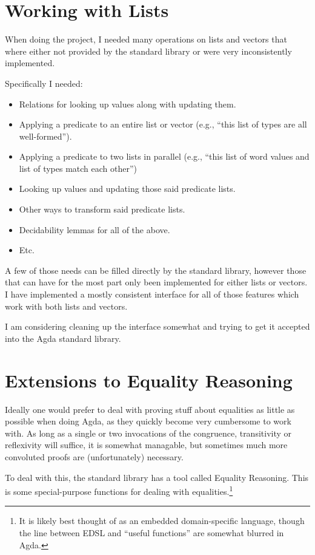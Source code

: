 \section{Working with Lists}
When doing the project, I needed many operations on lists and vectors that where
either not provided by the standard library or were very inconsistently
implemented.

Specifically I needed:

\begin{itemize}
\item Relations for looking up values along with updating them.
\item Applying a predicate to an entire list or vector (e.g., ``this list of types are all well-formed'').
\item Applying a predicate to two lists in parallel (e.g., ``this list of word values and list of types match each other'')
\item Looking up values and updating those said predicate lists.
\item Other ways to transform said predicate lists.
\item Decidability lemmas for all of the above.
\item Etc.
\end{itemize}

A few of those needs can be filled directly by the standard library, however
those that can have for the most part only been implemented for either lists or
vectors. I have implemented a mostly consistent interface for all of those
features which work with both lists and vectors.

I am considering cleaning up the interface somewhat and trying to get it
accepted into the Agda standard library.

\section{Extensions to Equality Reasoning}
Ideally one would prefer to deal with proving stuff about equalities as little
as possible when doing Agda, as they quickly become very cumbersome to work
with. As long as a single or two invocations of the congruence, transitivity or
reflexivity will suffice, it is somewhat managable, but sometimes much more
convoluted proofs are (unfortunately) necessary.

To deal with this, the standard library has a tool called Equality
Reasoning. This is some special-purpose functions for dealing with
equalities.\footnote{It is likely best thought of as an embedded domain-specific
  language, though the line between EDSL and ``useful functions'' are somewhat
  blurred in Agda.}

